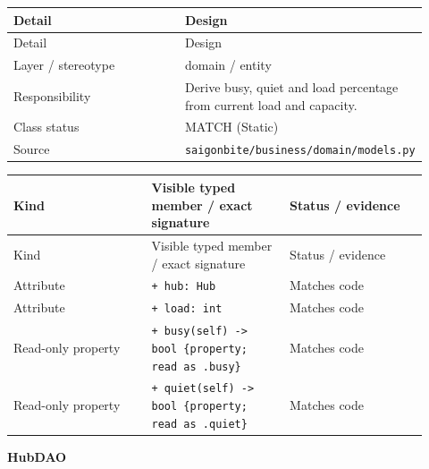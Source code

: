 \begin{longtable}{>{\raggedright\arraybackslash}p{0.4600\linewidth}>{\raggedright\arraybackslash}p{0.4600\linewidth}}
Detail & Design \\
\hline\endfirsthead
Detail & Design \\
\hline\endhead
Layer / stereotype & domain / \guillemotleft{}entity\guillemotright{} \\
Responsibility & Derive busy, quiet and load percentage from current load and capacity. \\
Class status & MATCH (Static) \\
Source & \texttt{saigonbite/\allowbreak{}business/\allowbreak{}domain/\allowbreak{}models.\allowbreak{}py} \\
\end{longtable}
\begin{longtable}{>{\raggedright\arraybackslash}p{0.3067\linewidth}>{\raggedright\arraybackslash}p{0.3067\linewidth}>{\raggedright\arraybackslash}p{0.3067\linewidth}}
Kind & Visible typed member / exact signature & Status / evidence \\
\hline\endfirsthead
Kind & Visible typed member / exact signature & Status / evidence \\
\hline\endhead
Attribute & \texttt{+ hub: Hub} & Matches code \\
Attribute & \texttt{+ load: int} & Matches code \\
Read-only property & \texttt{+ busy(self) -\textgreater{} bool \{property; read as .\allowbreak{}busy\}} & Matches code \\
Read-only property & \texttt{+ quiet(self) -\textgreater{} bool \{property; read as .\allowbreak{}quiet\}} & Matches code \\
\end{longtable}
\textbf{HubDAO}

